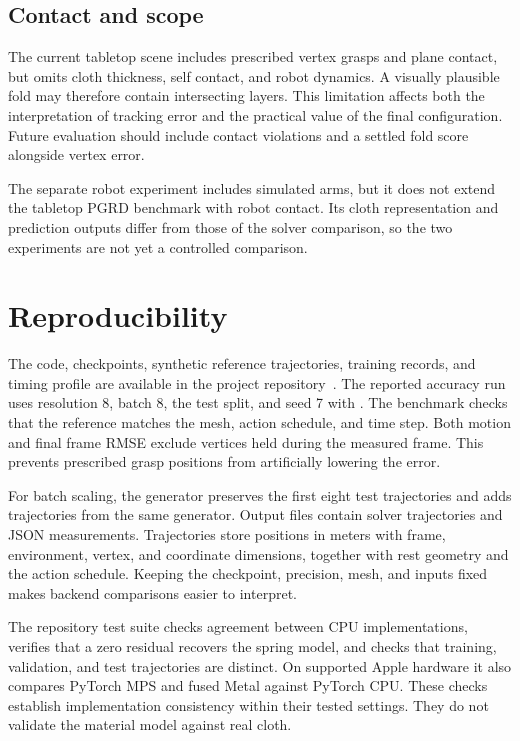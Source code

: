 \documentclass[sigconf]{acmart}
\begin{document}
\subsection{Contact and scope}
The current tabletop scene includes prescribed vertex grasps and plane contact, but omits cloth thickness, self contact, and robot dynamics. A visually plausible fold may therefore contain intersecting layers. This limitation affects both the interpretation of tracking error and the practical value of the final configuration. Future evaluation should include contact violations and a settled fold score alongside vertex error.

The separate robot experiment includes simulated arms, but it does not extend the tabletop PGRD benchmark with robot contact. Its cloth representation and prediction outputs differ from those of the solver comparison, so the two experiments are not yet a controlled comparison.

\section{Reproducibility}
The code, checkpoints, synthetic reference trajectories, training records, and timing profile are available in the project repository~\cite{projectcode}. The reported accuracy run uses resolution 8, batch 8, the test split, and seed 7 with . The benchmark checks that the reference matches the mesh, action schedule, and time step. Both motion and final frame RMSE exclude vertices held during the measured frame. This prevents prescribed grasp positions from artificially lowering the error.

For batch scaling, the generator preserves the first eight test trajectories and adds trajectories from the same generator. Output files contain solver trajectories and JSON measurements. Trajectories store positions in meters with frame, environment, vertex, and coordinate dimensions, together with rest geometry and the action schedule. Keeping the checkpoint, precision, mesh, and inputs fixed makes backend comparisons easier to interpret.

The repository test suite checks agreement between CPU implementations, verifies that a zero residual recovers the spring model, and checks that training, validation, and test trajectories are distinct. On supported Apple hardware it also compares PyTorch MPS and fused Metal against PyTorch CPU. These checks establish implementation consistency within their tested settings. They do not validate the material model against real cloth.
\end{document}
